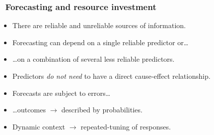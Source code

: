 \documentclass[11pt]{beamer}\usepackage[]{graphicx}\usepackage[]{xcolor}
\newcommand\basicicons[1]{{\lineabasicfont\symbol{#1}}}
\newcommand\futureicon{\colorbox{mygray}{\textcolor{black}{\basicicons{"0079}}}\xspace}
\begin{document}

\begin{frame}
\frametitle{\futureicon\ Forecasting and resource investment}
\begin{itemize}
  \item There are reliable and unreliable sources of information.
  \item Forecasting can depend on a single reliable predictor or\ldots
  \item \ldots on a combination of several less reliable predictors.
  \item Predictors \emph{do not need} to have a direct cause-effect relationship.
  \item Forecasts are subject to errors\ldots
  \item \ldots outcomes $\to$ described by probabilities.
  \item Dynamic context $\to$ repeated-tuning of responses.
\end{itemize}
\end{frame}
\end{document}
